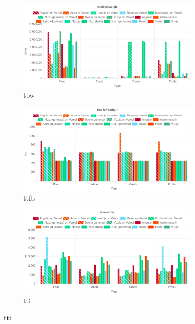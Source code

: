 \documentclass[a4paper, 12pt]{article}
\begin{document}
\begin{figure}[ht!]
  \centering
  \begin{subfigure}{0.8\linewidth}
    \begin{center}
      \includegraphics[width=\linewidth, keepaspectratio]{img/lighthouse-results/TBW.png}
    \end{center}
    \caption{\acrfull{tbw}}\label{subfig:LH:totalbyteweight}
  \end{subfigure}
  \begin{subfigure}{0.8\linewidth}
    \begin{center}
      \includegraphics[width=\linewidth, keepaspectratio]{img/lighthouse-results/TTFB.png}
    \end{center}
    \caption{\acrfull{ttfb}}\label{subfig:LH:timeToFirstByte}
  \end{subfigure}
  \begin{subfigure}{0.8\linewidth}
    \begin{center}
      \includegraphics[width=\linewidth, keepaspectratio]{img/lighthouse-results/TTI.png}
    \end{center}
    \caption{\acrfull{tti}}\label{subfig:LH:interactive}
  \end{subfigure}
\end{figure}
\end{document}
